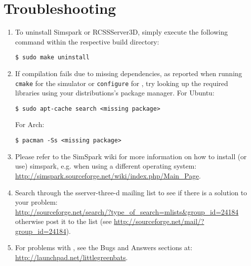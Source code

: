 \section{Troubleshooting}
\begin{enumerate}
    \item To uninstall Simspark or RCSSServer3D, simply execute the following command within the respective build directory:
\begin{verbatim}
$ sudo make uninstall
\end{verbatim}
    \item If compilation fails due to missing dependencies, as reported when running {\tt cmake} for the simulator or {\tt configure} for \libbats, try looking up the required libraries using your distributions's package manager. For Ubuntu:
\begin{verbatim}
$ sudo apt-cache search <missing package>
\end{verbatim}
For Arch:
\begin{verbatim}
$ pacman -Ss <missing package>
\end{verbatim}
    \item Please refer to the SimSpark wiki for more information on how to install (or use) simspark, e.g. when using a different operating system: \\
        \url{http://simspark.sourceforge.net/wiki/index.php/Main_Page}.
    \item Search through the sserver-three-d mailing list to see if there is a solution to your problem:\\
    \url{http://sourceforge.net/search/?type_of_search=mlists&group_id=24184}\\
    otherwise post it to the list (see \url{http://sourceforge.net/mail/?group_id=24184}).
    \item For problems with \libbats, see the Bugs and Answers sections at: \\
    \url{http://launchpad.net/littlegreenbats}.
\end{enumerate}

